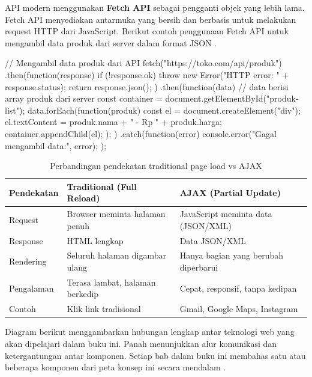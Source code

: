 API modern menggunakan \textbf{Fetch API} sebagai pengganti objek  yang lebih lama. Fetch API menyediakan antarmuka yang bersih dan berbasis  untuk melakukan request HTTP dari JavaScript. Berikut contoh penggunaan Fetch API untuk mengambil data produk dari server dalam format JSON \cite{mdnJsGuide}.

\begin{webcode}[language=JavaScript, caption={Contoh Fetch API: mengambil data produk dari server}]
// Mengambil data produk dari API
fetch("https://toko.com/api/produk")
  .then(function(response) {
    if (!response.ok) {
      throw new Error("HTTP error: " + response.status);
    }
    return response.json();
  })
  .then(function(data) {
    // data berisi array produk dari server
    const container = document.getElementById("produk-list");
    data.forEach(function(produk) {
      const el = document.createElement("div");
      el.textContent = produk.nama + " - Rp " + produk.harga;
      container.appendChild(el);
    });
  })
  .catch(function(error) {
    console.error("Gagal mengambil data:", error);
  });
\end{webcode}

\begin{table}[htbp]
\centering
\begin{tabular}{|P{3cm}|P{4cm}|P{4.5cm}|}
\hline
\textbf{Pendekatan} & \textbf{Traditional (Full Reload)} & \textbf{AJAX (Partial Update)} \\
\hline
Request & Browser meminta halaman penuh & JavaScript meminta data (JSON/XML) \\
\hline
Response & HTML lengkap & Data JSON/XML \\
\hline
Rendering & Seluruh halaman digambar ulang & Hanya bagian yang berubah diperbarui \\
\hline
Pengalaman & Terasa lambat, halaman berkedip & Cepat, responsif, tanpa kedipan \\
\hline
Contoh & Klik link tradisional & Gmail, Google Maps, Instagram \\
\hline
\end{tabular}
\caption{Perbandingan pendekatan traditional page load vs AJAX}
\end{table}

Diagram berikut menggambarkan hubungan lengkap antar teknologi web yang akan dipelajari dalam buku ini. Panah menunjukkan alur komunikasi dan ketergantungan antar komponen. Setiap bab dalam buku ini membahas satu atau beberapa komponen dari peta konsep ini secara mendalam \cite{webdevLearn}.

